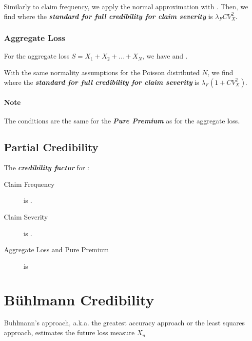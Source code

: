 \documentclass[english]{article}
\begin{document}
\begin{multicols*}{2}
\bigskip

Similarly to claim frequency, we apply the normal approximation with . Then, we find  where the \textbf{\textit{standard for full credibility for claim severity}} is $\lambda_{F}CV_{X}^{2}$.


\subsubsection{Aggregate Loss}
For the aggregate loss $S = X_{1} + X_{2} + \hdots + X_{N}$, we have  and .

\bigskip

With the same normality assumptions for the Poisson distributed $N$, we find  where the \textbf{\textit{standard for full credibility for claim severity}} is $\lambda_{F}(1 + CV_{X}^{2})$.

\paragraph{Note}	The conditions are the same for the \textit{\textbf{Pure Premium}} as for the aggregate loss.


\subsection{Partial Credibility}\label{subsec:PartialCred}
The \textbf{\textit{credibility factor}} for :
\begin{description}
	\item[Claim Frequency]	is .
	\item[Claim Severity]	is .
	\item[Aggregate Loss and Pure Premium]	is 
\end{description}


\newpage
\section{Bühlmann Credibility}\label{sec:Buhl}
\begin{rappel_enhanced}[Context]
Buhlmann's approach, a.k.a. the greatest accuracy approach or the least squares approach, estimates the future loss measure $X_{n }$
\end{rappel_enhanced}

\end{multicols*}
\end{document}
